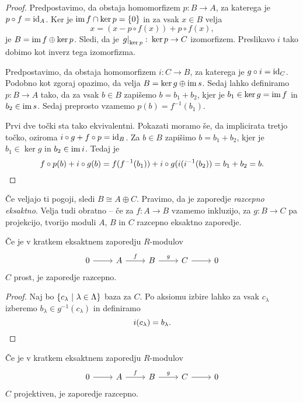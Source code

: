 \begin{proof}
Predpostavimo, da obstaja homomorfizem $p \colon B \to A$, za
katerega je $p \circ f = \operatorname{id}_A$. Ker je
$\operatorname{im} f \cap \ker p = \left\{0\right\}$ in za vsak $x \in B$ velja
\[
x = (x - p \circ f(x)) + p \circ f(x),
\]
je $B = \operatorname{im} f \oplus \ker p$. Sledi, da je
$\left. g\right|_{\ker p}^{} \colon \ker p \to C$ izomorfizem. Preslikavo
$i$ tako dobimo kot inverz tega izomorfizma.

Predpostavimo, da obstaja homomorfizem $i \colon C \to B$, za
katerega je $g \circ i = \operatorname{id}_C$. Podobno kot zgoraj opazimo, da
velja $B = \ker g \oplus \operatorname{im} s$. Sedaj lahko definiramo
$p \colon B \to A$ tako, da za vsak $b \in B$ zapišemo
$b = b_1 + b_2$, kjer je $b_1 \in \ker g = \operatorname{im} f$ in
$b_2 \in \operatorname{im} s$. Sedaj preprosto vzamemo $p(b) = f^{-1}(b_1)$.

Prvi dve točki sta tako ekvivalentni. Pokazati moramo še, da
implicirata tretjo točko, oziroma $i \circ g + f \circ p = \operatorname{id}_B$.
Za $b \in B$ zapišimo $b = b_1 + b_2$, kjer je $b_1 \in \ker g$
in $b_2 \in \operatorname{im} i$. Tedaj je
\[
f \circ p(b) + i \circ g(b) =
f(f^{-1}(b_1)) + i \circ g(i(i^{-1}(b_2)) =
b_1 + b_2 =
b. \qedhere
\]
\end{proof}

\begin{opomba}
Če veljajo ti pogoji, sledi $B \cong A \oplus C$. Pravimo, da je
zaporedje \emph{razcepno eksaktno}. Velja tudi obratno -- če za
$f \colon A \to B$ vzamemo inkluzijo, za $g \colon B \to C$ pa
projekcijo, tvorijo moduli $A$, $B$ in $C$ razcepno eksaktno
zaporedje.
\end{opomba}

\begin{trditev}
Če je v kratkem eksaktnem zaporedju $R$-modulov
\[
\begin{tikzcd}
0 \arrow[r] & A \arrow[r, "f"] & B \arrow[r, "g"] & C \arrow[r] & 0
\end{tikzcd}
\]
$C$ prost, je zaporedje razcepno.
\end{trditev}

\begin{proof}
Naj bo $\left\{c_\lambda~\middle\vert~\lambda \in \Lambda\right\}$ baza za $C$. Po
aksiomu izbire lahko za vsak $c_\lambda$ izberemo
$b_\lambda \in g^{-1}(c_\lambda)$ in definiramo
\[
i(c_\lambda) = b_\lambda. \qedhere
\]
\end{proof}

\begin{trditev}
Če je v kratkem eksaktnem zaporedju $R$-modulov
\[
\begin{tikzcd}
0 \arrow[r] & A \arrow[r, "f"] & B \arrow[r, "g"] & C \arrow[r] & 0
\end{tikzcd}
\]
$C$ projektiven, je zaporedje razcepno.
\end{trditev}

